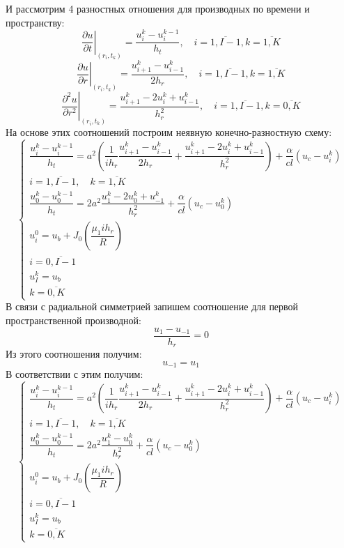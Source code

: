\documentclass[a4paper,12pt,russian, fleqn]{extreport}
\begin{document}
	И рассмотрим 4 разностных отношения для производных по времени и пространству:	
	\begin{equation*}
	\left.\dfrac{\partial u}{\partial t}\right|_{(r_i,t_k)} = \dfrac{u_i^k-u_i^{k-1}}{h_t}, \quad i = \overline{1, I-1}, k = \overline{1,K}
	\end{equation*}	
	\begin{equation*}
	\left.\dfrac{\partial u}{\partial r}\right|_{(r_i, t_k)} = \dfrac{u_{i+1}^k - u_{i-1}^k}{2h_r}, \quad i = \overline{1,I-1}, k = \overline{1,K}
	\end{equation*}	
	\begin{equation*}
	\left.\dfrac{\partial^2 u}{\partial r^2}\right|_{(r_i, t_k)} = \dfrac{u_{i+1}^k - 2u_i^k + u_{i-1}^k}{h^2_r}, \quad i = \overline{1,I-1}, k = \overline{0,K}
	\end{equation*}
	На основе этих соотношений построим неявную конечно-разностную схему:
	\begin{equation*}
		\left\{\begin{array}{l}
			\dfrac{u_i^{k}-u_i^{k-1}}{h_t} = a^2\left(\dfrac{1}{ih_r}\dfrac{u_{i+1}^k - u_{i-1}^k}{2h_r} +\dfrac{u_{i+1}^k - 2u_i^k + u_{i-1}^k}{h^2_r}\right) + \dfrac{\alpha}{cl}\left (u_c - u_i^k \right) \\
			i = \overline{1,I-1}, \quad k = \overline{1,K}	 \\
			\dfrac{u_0^{k}-u_0^{k-1}}{h_t} = 2a^2\dfrac{u_1^k-2u_0^k+u_{-1}^k}{h_r^2} + \dfrac{\alpha}{cl}(u_c-u_0^k) \\
			u_i^0 = u_b + J_0\left( \dfrac{\mu_1 ih_r}{R} \right) \\
			i = \overline{0, I-1} \\
			u_I^k = u_b \\
		k = \overline{0,K}
	\end{array}\right.
	\end{equation*}
	В связи с радиальной симметрией запишем соотношение для первой пространственной производной:
	\begin{equation*}
		\dfrac{u_1 - u_{-1}}{h_r} = 0
	\end{equation*}
	Из этого соотношения получим:
	\begin{equation*}
		u_{-1} = u_1
	\end{equation*}
	В соответствии с этим получим:
	\begin{equation}\label{ImplicitScheme}
		\left\{\begin{array}{l}
			\dfrac{u_i^{k}-u_i^{k-1}}{h_t} = a^2\left(\dfrac{1}{ih_r}\dfrac{u_{i+1}^k - u_{i-1}^k}{2h_r} +\dfrac{u_{i+1}^k - 2u_i^k + u_{i-1}^k}{h^2_r}\right) + \dfrac{\alpha}{cl}\left (u_c - u_i^k \right) \\
			i = \overline{1,I-1}, \quad k = \overline{1,K}	 \\
			\dfrac{u_0^{k}-u_0^{k-1}}{h_t} = 2a^2\dfrac{u_1^k-u_0^k}{h_r^2} + \dfrac{\alpha}{cl}(u_c-u_0^k) \\
			u_i^0 = u_b + J_0\left( \dfrac{\mu_1 ih_r}{R} \right) \\
			i = \overline{0, I-1} \\
			u_I^k = u_b \\
			k = \overline{0,K}
		\end{array}\right.
	\end{equation}
\end{document}
